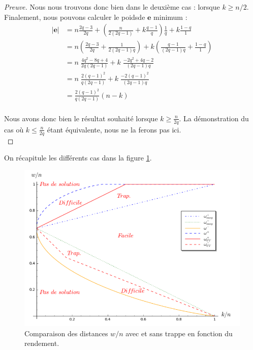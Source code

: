 \documentclass[12pt]{article}
\theoremstyle{plain}
\theoremstyle{definition}
\newcommand{\e}{\mathbf{e}}
\begin{document}
\begin{proof}[Preuve]
Nous nous trouvons donc bien dans le deuxième cas : lorsque $k \geq n/2$. Finalement, nous pouvons calculer le poidsde $\e$ minimum :
\begin{equation*}
\begin{split}
|\e| &= n\frac{2q-3}{2q} + \left(\frac{n}{2(2q-1)} + k\frac{q-1}{q}\right)\frac{1}{q}+ k \frac{1-q}{1}\\
&= n\left(\frac{2q-3}{2q} + \frac{1}{2(2q-1)q}\right) + k\left(\frac{q-1}{(2q-1)q}+ \frac{1-q}{1}\right)\\
&= n\;\frac{4q^2-8q+4}{2q(2q-1)} + k\;\frac{-2q^2+4q-2}{(2q-1)q}\\
&= n\;\frac{2(q-1)^2}{q(2q-1)} + k\;\frac{-2(q-1)^2}{(2q-1)q}\\
&= \frac{2(q-1)^2}{q(2q-1)}(n-k)\\
\end{split}
\end{equation*}

\noindent Nous avons donc bien le résultat souhaité lorsque $ k \geq \frac{n}{2q}$. La démonstration du cas où $k \leq \frac{n}{2q}$ étant équivalente, nous ne la ferons pas ici.\\

\end{proof}

\noindent On récapitule les différents cas dans la figure \ref{graphique ratio}. \\

\begin{figure}[h]
\begin{center}
\includegraphics [scale=0.4]{include/graph_ratio_w.png}
\end{center}
\caption{\small Comparaison des distances $w/n$ avec et sans trappe en fonction du rendement.}
\label{graphique ratio}
\end{figure}
\end{document}
